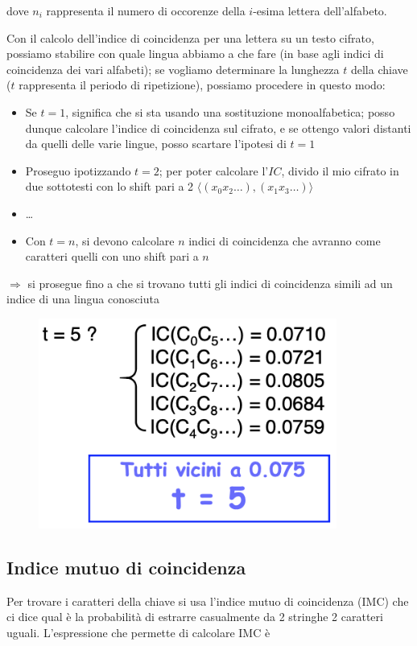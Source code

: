 \noindent dove $n_i$ rappresenta il numero di occorenze della $i$-esima lettera dell'alfabeto.

\noindent Con il calcolo dell'indice di coincidenza per una lettera su un testo cifrato, possiamo stabilire con quale lingua abbiamo a che fare (in 
base agli indici di coincidenza dei vari alfabeti); se vogliamo determinare la lunghezza $t$ della chiave ($t$ rappresenta il periodo
di ripetizione), possiamo procedere in questo modo:
\begin{itemize}
    \item Se $t=1$, significa che si sta usando una sostituzione monoalfabetica; posso dunque calcolare l'indice di coincidenza sul cifrato, e se ottengo 
    valori distanti da quelli delle varie lingue, posso scartare l'ipotesi di $t=1$
    \item Proseguo ipotizzando $t=2$; per poter calcolare l'$IC$, divido il mio cifrato in due sottotesti con lo shift pari a 2 $\langle(x_0x_2 \dots), (x_1x_3 \dots)\rangle$
    \item \dots
    \item Con $t=n$, si devono calcolare $n$ indici di coincidenza che avranno come caratteri quelli con uno shift pari a $n$
\end{itemize}

$\Rightarrow$ si prosegue fino a che si trovano tutti gli indici di coincidenza simili ad un indice di 
una lingua conosciuta

\begin{figure}[H]
    \centering
    \includegraphics[width=0.5\linewidth]{chapters/chap3/images/pic2.png}
\end{figure}


\subsection{Indice mutuo di coincidenza}

Per trovare i caratteri della chiave si usa l'indice mutuo di coincidenza (IMC) che ci dice qual è la probabilità di estrarre casualmente 
da 2 stringhe 2 caratteri uguali. L'espressione che permette di calcolare IMC è 

